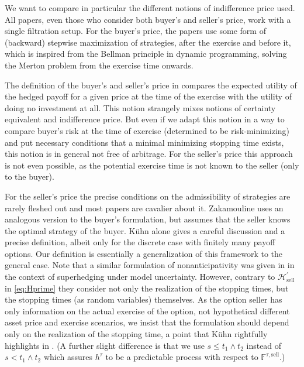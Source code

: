 \documentclass{article}
\begin{document}
We want to compare in particular the different notions of indifference price used. All papers, even those who consider both buyer's and seller's price, work with a single filtration setup. For the buyer's price, the papers \cite{DZ95, Dam06, Zak05, OZ03, LS09, LSZ12, GK22} use some form of (backward) stepwise maximization of strategies, after the exercise and before it, which is inspired from the Bellman principle in dynamic programming, solving the Merton problem from the exercise time onwards.

The definition of the buyer's and seller's price in \cite{BZ14} compares the expected utility of the hedged payoff for a given price at the time of the exercise with the utility of doing no investment at all. This notion strangely mixes notions of certainty equivalent and indifference price. But even if we adapt this notion in a way to compare buyer's risk at the time of exercise (determined to be risk-minimizing) and put necessary conditions that a minimal minimizing stopping time exists, this notion is in general not free of arbitrage. For the seller's price this approach is not even possible, as the potential exercise time is not known to the seller (only to the buyer).

For the seller's price the precise conditions on the admissibility of strategies are rarely fleshed out and most papers are cavalier about it. Zakamouline \cite{Zak05} uses an analogous version to the buyer's formulation, but assumes that the seller knows the optimal strategy of the buyer. K\"{u}hn \cite{Kue02} alone gives a careful discussion and a precise definition, albeit only for the discrete case with finitely many payoff options. Our definition is essentially a generalization of this framework to the general case. Note that a similar formulation of nonanticipativity was given in \cite{BHZ15} in the context of superhedging under model uncertainty. However, contrary to $\mathcal H^\prime_{\text{sell}}$ in \eqref{eq:Hprime} they consider not only the realization of the stopping times, but the stopping times (as random variables) themselves. As the option seller has only information on the actual exercise of the option, not hypothetical different asset price and exercise scenarios, we insist that the formulation should depend only on the realization of the stopping time, a point that K\"{u}hn rightfully highlights in \cite[Remark 2.3]{Kue02}. (A further slight difference is that we use $s\leq t_1\wedge t_2$ instead of $s< t_1\wedge t_2$ which assures $h^\tau$ to be a predictable process with respect to $\mathbb{F}^{\tau, \text{sell}}$.)
\end{document}
